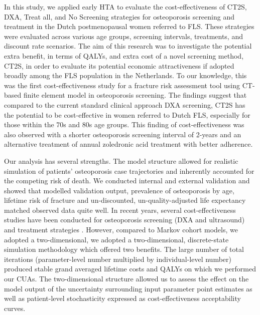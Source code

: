 In this study, we applied early HTA to evaluate the cost-effectiveness of CT2S, DXA, Treat all, and No Screening strategies for osteoporosis screening and treatment in the Dutch postmenopausal women referred to FLS. These strategies were evaluated across various age groups, screening intervals, treatments, and discount rate scenarios. The aim of this research was to investigate the potential extra benefit, in terms of QALYs, and extra cost of a novel screening method, CT2S, in order to evaluate its potential economic attractiveness if adopted broadly among the FLS population in the Netherlands. To our knowledge, this was the first cost-effectiveness study for a fracture risk assessment tool using CT-based finite element model in osteoporosis screening. The findings suggest that compared to the current standard clinical approach DXA screening, CT2S has the potential to be cost-effective in women referred to Dutch FLS, especially for those within the 70s and 80s age groups. This finding of cost-effectiveness was also observed with a shorter osteoporosis screening interval of 2-years and an alternative treatment of annual zoledronic acid treatment with better adherence.

Our analysis has several strengths. The model structure allowed for realistic simulation of patients' osteoporosis case trajectories and inherently accounted for the competing risk of death. We conducted internal and external validation and showed that modelled validation output, prevalence of osteoporosis by age, lifetime risk of fracture and un-discounted, un-quality-adjusted life expectancy matched observed data quite well. In recent years, several cost-effectiveness studies have been conducted for osteoporosis screening (DXA and ultrasound) and treatment strategies \cite{4-45,4-75,4-76,4-77,4-78}. However, compared to Markov cohort models, we adopted a two-dimensional, we adopted a two-dimensional, discrete-state simulation methodology which offered two benefits. The large number of total iterations (parameter-level number multiplied by individual-level number) produced stable grand averaged lifetime costs and QALYs on which we performed our CUAs. The two-dimensional structure allowed us to assess the effect on the model output of the uncertainty surrounding input parameter point estimates as well as patient-level stochasticity expressed as cost-effectiveness acceptability curves.

